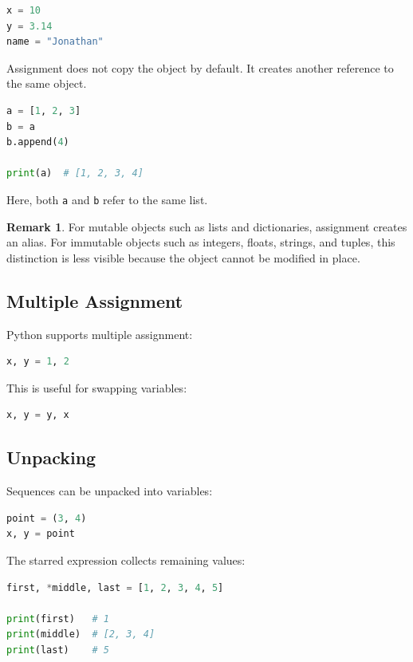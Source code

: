 \documentclass[12pt,oneside]{book}
\numberwithin{equation}{section}
\theoremstyle{definition}
\newtheorem{remark}{Remark}[section]
\theoremstyle{plain}
\theoremstyle{remark}
\begin{document}
\begin{lstlisting}[language=Python]
x = 10
y = 3.14
name = "Jonathan"
\end{lstlisting}

Assignment does not copy the object by default. It creates another reference to the same object.

\begin{lstlisting}[language=Python]
a = [1, 2, 3]
b = a
b.append(4)

print(a)  # [1, 2, 3, 4]
\end{lstlisting}

Here, both \texttt{a} and \texttt{b} refer to the same list.

\begin{remark}
For mutable objects such as lists and dictionaries, assignment creates an alias. For immutable objects such as integers, floats, strings, and tuples, this distinction is less visible because the object cannot be modified in place.
\end{remark}

\subsection{Multiple Assignment}

Python supports multiple assignment:
\begin{lstlisting}[language=Python]
x, y = 1, 2
\end{lstlisting}

This is useful for swapping variables:
\begin{lstlisting}[language=Python]
x, y = y, x
\end{lstlisting}

\subsection{Unpacking}

Sequences can be unpacked into variables:
\begin{lstlisting}[language=Python]
point = (3, 4)
x, y = point
\end{lstlisting}

The starred expression collects remaining values:
\begin{lstlisting}[language=Python]
first, *middle, last = [1, 2, 3, 4, 5]

print(first)   # 1
print(middle)  # [2, 3, 4]
print(last)    # 5
\end{lstlisting}
\end{document}
